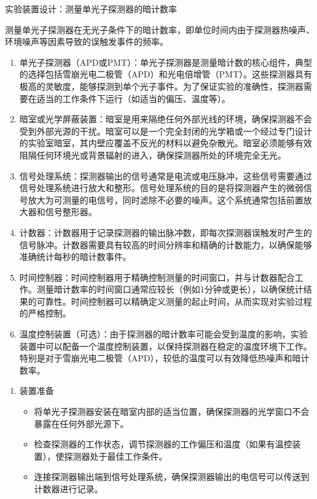 \begin{ubox}{实验装置设计：测量单光子探测器的暗计数率}
	
	测量单光子探测器在无光子条件下的暗计数率，即单位时间内由于探测器热噪声、环境噪声等因素导致的误触发事件的频率。
	
	\begin{enumerate}
		\item 单光子探测器（APD或PMT）：单光子探测器是测量暗计数的核心组件，典型的选择包括雪崩光电二极管（APD）和光电倍增管（PMT）。这些探测器具有极高的灵敏度，能够探测到单个光子事件。为了保证实验的准确性，探测器需要在适当的工作条件下运行（如适当的偏压、温度等）。
		
		\item 暗室或光学屏蔽装置：暗室是用来隔绝任何外部光线的环境，确保探测器不会受到外部光源的干扰。暗室可以是一个完全封闭的光学箱或一个经过专门设计的实验室暗室，其内壁应覆盖不反光的材料以避免杂散光。暗室必须能够有效阻隔任何环境光或背景辐射的进入，确保探测器所处的环境完全无光。
		
		\item 信号处理系统：探测器输出的信号通常是电流或电压脉冲，这些信号需要通过信号处理系统进行放大和整形。信号处理系统的目的是将探测器产生的微弱信号放大为可测量的电信号，同时滤除不必要的噪声。这个系统通常包括前置放大器和信号整形器。
		
		\item 计数器：计数器用于记录探测器的输出脉冲数，即每次探测器误触发时产生的信号脉冲。计数器需要具有较高的时间分辨率和精确的计数能力，以确保能够准确统计每秒的暗计数事件。
		
		\item 时间控制器：时间控制器用于精确控制测量的时间窗口，并与计数器配合工作。测量暗计数率的时间窗口通常应较长（例如1分钟或更长），以确保统计结果的可靠性。时间控制器可以精确定义测量的起止时间，从而实现对实验过程的严格控制。
		
		\item 温度控制装置（可选）：由于探测器的暗计数率可能会受到温度的影响，实验装置中可以配备一个温度控制装置，以保持探测器在稳定的温度环境下工作。特别是对于雪崩光电二极管（APD），较低的温度可以有效降低热噪声和暗计数率。
	\end{enumerate}
	
	\begin{enumerate}
		\item 装置准备  
		\begin{itemize}
			\item 将单光子探测器安装在暗室内部的适当位置，确保探测器的光学窗口不会暴露在任何外部光源下。
			\item 检查探测器的工作状态，调节探测器的工作偏压和温度（如果有温控装置），使探测器处于最佳工作条件。
			\item 连接探测器输出端到信号处理系统，确保探测器输出的电信号可以传送到计数器进行记录。
		\end{itemize}
		

\end{enumerate}
\end{ubox}

